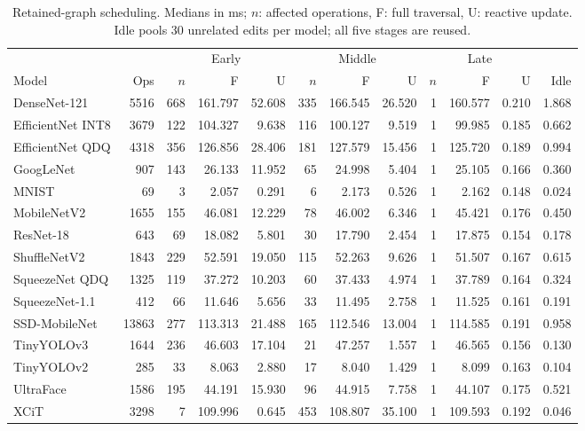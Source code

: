 \begin{table}[!htbp]
\centering\scriptsize
\caption{Retained-graph scheduling. Medians in ms; $n$: affected operations,
F: full traversal, U: reactive update. Idle pools 30 unrelated edits per model;
all five stages are reused.}
\label{tab:retained-scheduling}
\setlength{\tabcolsep}{2pt}
\renewcommand{\arraystretch}{1.12}
\begin{tabular*}{\textwidth}{@{\extracolsep{\fill}}lrrrrrrrrrrr@{}}
\toprule
 & & \multicolumn{3}{c}{Early} & \multicolumn{3}{c}{Middle} & \multicolumn{3}{c}{Late} & \\
\cmidrule(lr){3-5}\cmidrule(lr){6-8}\cmidrule(lr){9-11}
Model & Ops & $n$ & F & U & $n$ & F & U & $n$ & F & U & Idle \\
\midrule
DenseNet-121 & 5516 & 668 & 161.797 & 52.608 & 335 & 166.545 & 26.520 & 1 & 160.577 & 0.210 & 1.868 \\
EfficientNet INT8 & 3679 & 122 & 104.327 & 9.638 & 116 & 100.127 & 9.519 & 1 & 99.985 & 0.185 & 0.662 \\
EfficientNet QDQ & 4318 & 356 & 126.856 & 28.406 & 181 & 127.579 & 15.456 & 1 & 125.720 & 0.189 & 0.994 \\
GoogLeNet & 907 & 143 & 26.133 & 11.952 & 65 & 24.998 & 5.404 & 1 & 25.105 & 0.166 & 0.360 \\
MNIST & 69 & 3 & 2.057 & 0.291 & 6 & 2.173 & 0.526 & 1 & 2.162 & 0.148 & 0.024 \\
MobileNetV2 & 1655 & 155 & 46.081 & 12.229 & 78 & 46.002 & 6.346 & 1 & 45.421 & 0.176 & 0.450 \\
ResNet-18 & 643 & 69 & 18.082 & 5.801 & 30 & 17.790 & 2.454 & 1 & 17.875 & 0.154 & 0.178 \\
ShuffleNetV2 & 1843 & 229 & 52.591 & 19.050 & 115 & 52.263 & 9.626 & 1 & 51.507 & 0.167 & 0.615 \\
SqueezeNet QDQ & 1325 & 119 & 37.272 & 10.203 & 60 & 37.433 & 4.974 & 1 & 37.789 & 0.164 & 0.324 \\
SqueezeNet-1.1 & 412 & 66 & 11.646 & 5.656 & 33 & 11.495 & 2.758 & 1 & 11.525 & 0.161 & 0.191 \\
SSD-MobileNet & 13863 & 277 & 113.313 & 21.488 & 165 & 112.546 & 13.004 & 1 & 114.585 & 0.191 & 0.958 \\
TinyYOLOv3 & 1644 & 236 & 46.603 & 17.104 & 21 & 47.257 & 1.557 & 1 & 46.565 & 0.156 & 0.130 \\
TinyYOLOv2 & 285 & 33 & 8.063 & 2.880 & 17 & 8.040 & 1.429 & 1 & 8.099 & 0.163 & 0.104 \\
UltraFace & 1586 & 195 & 44.191 & 15.930 & 96 & 44.915 & 7.758 & 1 & 44.107 & 0.175 & 0.521 \\
XCiT & 3298 & 7 & 109.996 & 0.645 & 453 & 108.807 & 35.100 & 1 & 109.593 & 0.192 & 0.046 \\
\bottomrule\end{tabular*}
\end{table}


